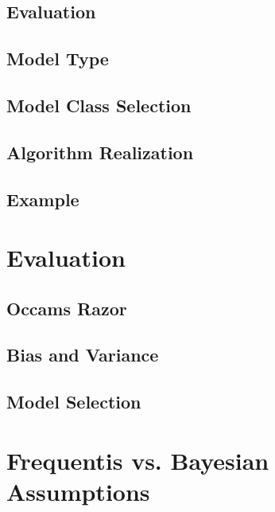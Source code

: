 		\subsection{Evaluation} %

		\subsection{Model Type} %

		\subsection{Model Class Selection} %

		\subsection{Algorithm Realization} %

		\subsection{Example} %

	\section{Evaluation} %

		\subsection{Occams Razor} %

		\subsection{Bias and Variance} %

		\subsection{Model Selection} %

	\section{Frequentis vs. Bayesian Assumptions} %

